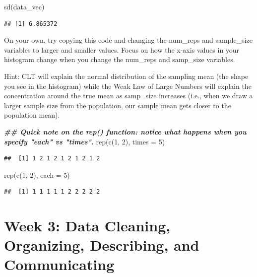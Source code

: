 \documentclass[
]{book}
\newenvironment{Shaded}{\begin{snugshade}}{\end{snugshade}}
\newcommand{\AttributeTok}[1]{\textcolor[rgb]{0.77,0.63,0.00}{#1}}
\newcommand{\DecValTok}[1]{\textcolor[rgb]{0.00,0.00,0.81}{#1}}
\newcommand{\DocumentationTok}[1]{\textcolor[rgb]{0.56,0.35,0.01}{\textbf{\textit{#1}}}}
\newcommand{\FunctionTok}[1]{\textcolor[rgb]{0.00,0.00,0.00}{#1}}
\newcommand{\NormalTok}[1]{#1}
\begin{document}
\begin{Shaded}
\begin{Highlighting}[]
\FunctionTok{sd}\NormalTok{(data\_vec)}
\end{Highlighting}
\end{Shaded}

\begin{verbatim}
## [1] 6.865372
\end{verbatim}

On your own, try copying this code and changing the num\_reps and sample\_size variables to larger and smaller values. Focus on how the x-axis values in your histogram change when you change the num\_reps and samp\_size variables.

Hint: CLT will explain the normal distribution of the sampling mean (the shape you see in the histogram) while the Weak Law of Large Numbers will explain the concentration around the true mean as samp\_size increases (i.e., when we draw a larger sample size from the population, our sample mean gets closer to the population mean).

\begin{Shaded}
\begin{Highlighting}[]
\DocumentationTok{\#\# Quick note on the rep() function: notice what happens when you specify "each" vs "times".}
\FunctionTok{rep}\NormalTok{(}\FunctionTok{c}\NormalTok{(}\DecValTok{1}\NormalTok{, }\DecValTok{2}\NormalTok{), }\AttributeTok{times =} \DecValTok{5}\NormalTok{)}
\end{Highlighting}
\end{Shaded}

\begin{verbatim}
##  [1] 1 2 1 2 1 2 1 2 1 2
\end{verbatim}

\begin{Shaded}
\begin{Highlighting}[]
\FunctionTok{rep}\NormalTok{(}\FunctionTok{c}\NormalTok{(}\DecValTok{1}\NormalTok{, }\DecValTok{2}\NormalTok{), }\AttributeTok{each =} \DecValTok{5}\NormalTok{)}
\end{Highlighting}
\end{Shaded}

\begin{verbatim}
##  [1] 1 1 1 1 1 2 2 2 2 2
\end{verbatim}

\hypertarget{week-3-data-cleaning-organizing-describing-and-communicating}{%
\chapter{Week 3: Data Cleaning, Organizing, Describing, and Communicating}\label{week-3-data-cleaning-organizing-describing-and-communicating}}
\end{document}
